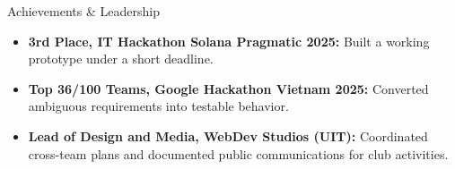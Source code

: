 \documentclass{resume}
\begin{document}
\begin{rSection}{Achievements \& Leadership}
\vspace{-3pt}
\begin{itemize}
    \itemsep -3pt {}
    \item \textbf{3rd Place, IT Hackathon Solana Pragmatic 2025:} Built a working prototype under a short deadline.
    \item \textbf{Top 36/100 Teams, Google Hackathon Vietnam 2025:} Converted ambiguous requirements into testable behavior.
    \item \textbf{Lead of Design and Media, WebDev Studios (UIT):} Coordinated cross-team plans and documented public communications for club activities.
\end{itemize}
\end{rSection}
\end{document}

